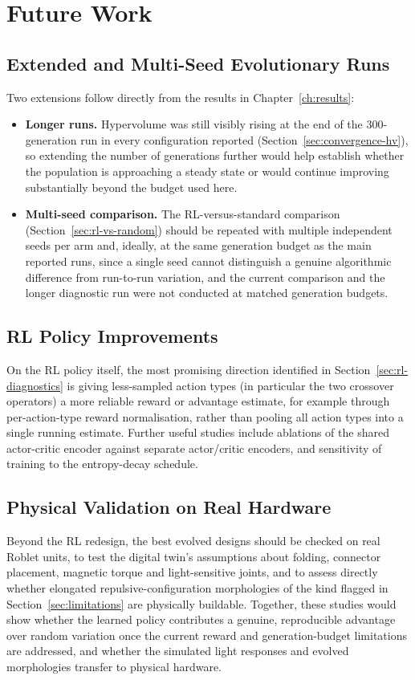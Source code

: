 \documentclass[12pt,a4paper]{report}
\begin{document}
\section{Future Work}

\subsection{Extended and Multi-Seed Evolutionary Runs}
Two extensions follow directly from the results in Chapter~\ref{ch:results}:
\begin{itemize}
    \item \textbf{Longer runs.} Hypervolume was still visibly rising at the end of the 300-generation run in every configuration reported (Section~\ref{sec:convergence-hv}), so extending the number of generations further would help establish whether the population is approaching a steady state or would continue improving substantially beyond the budget used here.
    \item \textbf{Multi-seed comparison.} The RL-versus-standard comparison (Section~\ref{sec:rl-vs-random}) should be repeated with multiple independent seeds per arm and, ideally, at the same generation budget as the main reported runs, since a single seed cannot distinguish a genuine algorithmic difference from run-to-run variation, and the current comparison and the longer diagnostic run were not conducted at matched generation budgets.
\end{itemize}

\subsection{RL Policy Improvements}
On the RL policy itself, the most promising direction identified in Section~\ref{sec:rl-diagnostics} is giving less-sampled action types (in particular the two crossover operators) a more reliable reward or advantage estimate, for example through per-action-type reward normalisation, rather than pooling all action types into a single running estimate. Further useful studies include ablations of the shared actor-critic encoder against separate actor/critic encoders, and sensitivity of training to the entropy-decay schedule.

\subsection{Physical Validation on Real Hardware}
Beyond the RL redesign, the best evolved designs should be checked on real Roblet units, to test the digital twin's assumptions about folding, connector placement, magnetic torque and light-sensitive joints, and to assess directly whether elongated repulsive-configuration morphologies of the kind flagged in Section~\ref{sec:limitations} are physically buildable. Together, these studies would show whether the learned policy contributes a genuine, reproducible advantage over random variation once the current reward and generation-budget limitations are addressed, and whether the simulated light responses and evolved morphologies transfer to physical hardware.
\end{document}
